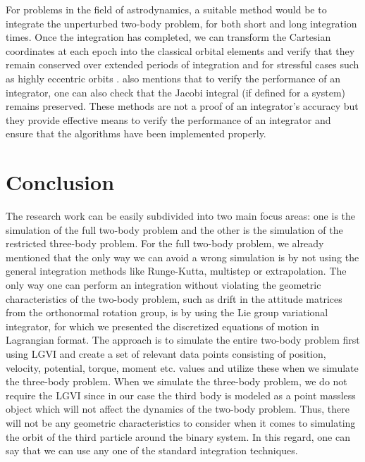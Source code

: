 For problems in the field of astrodynamics, a suitable method would be to integrate the unperturbed two-body problem, for both short and long integration times. Once the integration has completed, we can transform the Cartesian coordinates at each epoch into the classical orbital elements and verify that they remain conserved over extended periods of integration and for stressful cases such as highly eccentric orbits \cite{danbook}. \cite{danbook} also mentions that to verify the performance of an integrator, one can also check that the Jacobi integral (if defined for a system) remains preserved. These methods are not a proof of an integrator's accuracy but they provide effective means to verify the performance of an integrator and ensure that the algorithms have been implemented properly.

\section{Conclusion}
\label{integrator_conclusion}
The research work can be easily subdivided into two main focus areas: one is the simulation of the full two-body problem and the other is the simulation of the restricted three-body problem. For the full two-body problem, we already mentioned that the only way we can avoid a wrong simulation is by not using the general integration methods like Runge-Kutta, multistep or extrapolation. The only way one can perform an integration without violating the geometric characteristics of the two-body problem, such as drift in the attitude matrices from the orthonormal rotation group, is by using the Lie group variational integrator, for which we presented the discretized equations of motion in Lagrangian format. The approach is to simulate the entire two-body problem first using \gls{LGVI} and create a set of relevant data points consisting of position, velocity, potential, torque, moment etc. values and utilize these when we simulate the three-body problem. When we simulate the three-body problem, we do not require the \gls{LGVI} since in our case the third body is modeled as a point massless object which will not affect the dynamics of the two-body problem. Thus, there will not be any geometric characteristics to consider when it comes to simulating the orbit of the third particle around the binary system. In this regard, one can say that we can use any one of the standard integration techniques.

